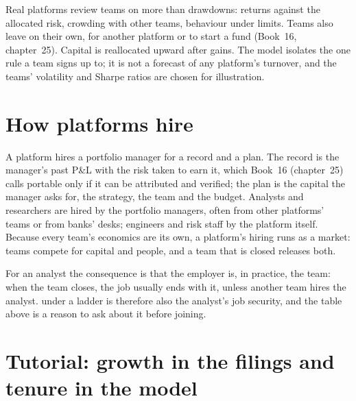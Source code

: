 \begin{remark}\label{rem:in:multi-manager-platforms:model}
Real platforms review teams on more than drawdowns: returns against the allocated risk, crowding with other teams,
behaviour under limits. Teams also leave on their own, for another platform or to start a fund (Book~16, chapter~25).
Capital is reallocated upward after gains. The model isolates the one rule a team signs up to; it is not a forecast of
any platform's turnover, and the teams' volatility and Sharpe ratios are chosen for illustration.
\end{remark}

\section{How platforms hire}

A platform hires a portfolio manager for a record and a plan. The record is the manager's past P\&L with the risk taken
to earn it, which Book~16 (chapter~25) calls portable only if it can be attributed and verified; the plan is the capital
the manager asks for, the strategy, the team and the budget. Analysts and researchers are hired by the portfolio
managers, often from other platforms' teams or from banks' desks; engineers and risk staff by the platform itself.
Because every team's economics are its own, a platform's hiring runs as a market: teams compete for capital and people,
and a team that is closed releases both.

For an analyst the consequence is that the employer is, in practice, the team: when the team closes, the job usually
ends with it, unless another team hires the analyst.  under a ladder is therefore also the analyst's job security,
and the table above is a reason to ask about it before joining.

\section{Tutorial: growth in the filings and tenure in the model}\label{tut:in:multi-manager-platforms:tut}

